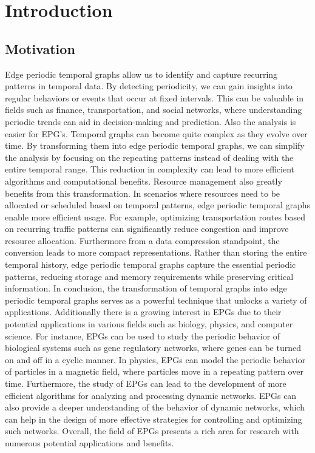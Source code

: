 \chapter{Introduction}
\label{ch:Introduction}
\section{Motivation}
\label{ch:Introduction:sec:Motivation}
Edge periodic temporal graphs allow us to identify and capture recurring patterns in temporal data. By detecting periodicity, we can gain insights into regular behaviors or events that occur at fixed intervals. This can be valuable in fields such as finance, transportation, and social networks, where understanding periodic trends can aid in decision-making and prediction. Also the analysis is easier for EPG's. Temporal graphs can become quite complex as they evolve over time. By transforming them into edge periodic temporal graphs, we can simplify the analysis by focusing on the repeating patterns instead of dealing with the entire temporal range. This reduction in complexity can lead to more efficient algorithms and computational benefits. Resource management also greatly benefits from this transformation. In scenarios where resources need to be allocated or scheduled based on temporal patterns, edge periodic temporal graphs enable more efficient usage. For example, optimizing transportation routes based on recurring traffic patterns can significantly reduce congestion and improve resource allocation. Furthermore from a data compression standpoint, the conversion leads to more compact representations. Rather than storing the entire temporal history, edge periodic temporal graphs capture the essential periodic patterns, reducing storage and memory requirements while preserving critical information. In conclusion, the transformation of temporal graphs into edge periodic temporal graphs serves as a powerful technique that unlocks a variety of applications. Additionally there is a growing interest in EPGs due to their potential applications in various fields such as biology, physics, and computer science. For instance, EPGs can be used to study the periodic behavior of biological systems such as gene regulatory networks, where genes can be turned on and off in a cyclic manner. In physics, EPGs can model the periodic behavior of particles in a magnetic field, where particles move in a repeating pattern over time. Furthermore, the study of EPGs can lead to the development of more efficient algorithms for analyzing and processing dynamic networks. EPGs can also provide a deeper understanding of the behavior of dynamic networks, which can help in the design of more effective strategies for controlling and optimizing such networks. Overall, the field of EPGs presents a rich area for research with numerous potential applications and benefits.
